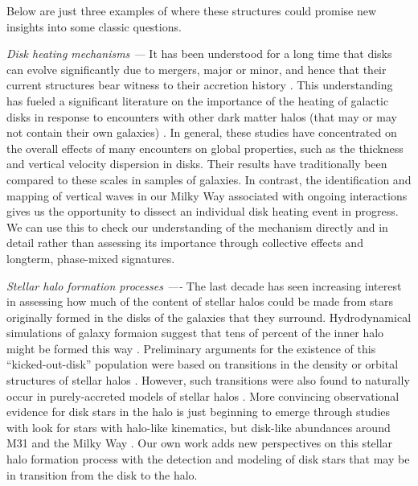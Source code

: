 \documentclass[galaxies,article,submit,moreauthors,pdftex,10pt,a4paper]{mdpi}
\begin{document}
Below are just three examples of where these structures could promise new insights into some classic questions.
\begin{description}
\item{\it Disk heating mechanisms ---}
It has been understood for a long time that disks can evolve significantly due to mergers, major or minor, and hence that their current structures bear witness to their accretion history \citep{toth92,quinn93,walker96,velasquez99}.
This understanding has fueled a significant literature on the importance of the heating of galactic disks in response to encounters with other dark matter halos (that may or may not contain their own galaxies) \citep{font01,ardi03,benson04,stewart08,hopkins08,villalobos08,purcell09,kazantzidis09,sachdeva16,moetazedian16}.
In general, these studies have concentrated on the overall effects of many encounters on global properties, such as the thickness and vertical velocity dispersion in disks.
Their results have traditionally been compared to these scales in samples of galaxies.
In contrast, the identification and mapping of vertical waves in our Milky Way associated with ongoing interactions gives us the opportunity to dissect an individual disk heating event in progress.
We can use this to check our understanding of the mechanism directly and in detail rather than assessing its importance through collective effects and longterm, phase-mixed signatures.
\item{\it Stellar halo formation processes ----}
The last decade has seen increasing interest in assessing how much of the content of stellar halos could be made from stars originally formed in the disks of the galaxies that they surround. Hydrodynamical simulations of galaxy formaion suggest that tens of percent of the inner halo might be formed this way
\citep{abadi06,zolotov09,zolotov10,font11,mccarthy12,tissera13,tissera14,pillepich15,cooper15}.
Preliminary arguments for the existence of this ``kicked-out-disk'' population were based on transitions in the density or orbital structures of stellar halos \citep[e.e.][]{carollo07}.
However, such transitions were also found to naturally occur in purely-accreted models of stellar halos \citep{deason13}.
More convincing observational evidence for disk stars in the halo is just beginning to emerge through studies with look for stars with halo-like kinematics, but disk-like abundances around M31 \citep{dorman13} and the Milky Way \citep{sheffiled12,hawkins15,bonaca17}.
Our own work adds new perspectives on this stellar halo formation process with the detection and modeling of disk stars that may be in transition from the disk to the halo.

\end{description}
\end{document}
